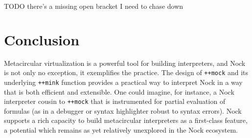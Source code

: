 \documentclass[twoside]{article}
\begin{document}
TODO there's a missing open bracket I need to chase down

\section{Conclusion}

Metacircular virtualization is a powerful tool for building interpreters, and Nock is not only no exception, it exemplifies the practice.  The design of \lstinline[style=inlinecode]{++mock} and its underlying \lstinline[style=inlinecode]{++mink} function provides a practical way to interpret Nock in a way that is both efficient and extensible.  One could imagine, for instance, a Nock interpreter cousin to \lstinline[style=inlinecode]{++mock} that is instrumented for partial evaluation of formulas (as in a debugger or syntax highlighter robust to syntax errors).  Nock supports a rich capacity to build metacircular interpreters as a first-class feature, a potential which remains as yet relatively unexplored in the Nock ecosystem.

\printbibliography
\end{document}
